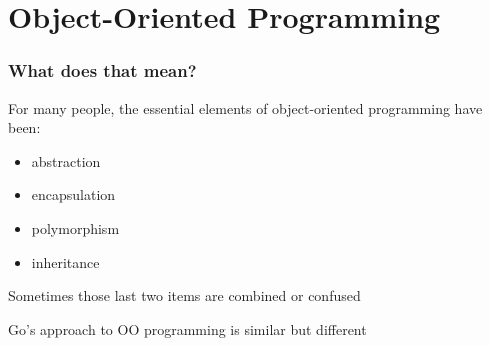 \documentclass[handout,compress,t,11pt]{beamer}
\begin{document}

%
%
%
% 
%
%
%
%
%



\section{Object-Oriented Programming}
\begin{frame}[fragile]
    \frametitle{What does that mean?}
    For many people, the essential elements of object-oriented programming
    have been:
    \begin{itemize}
        \item abstraction
        \item encapsulation
        \item polymorphism
        \item inheritance
    \end{itemize}
    \vspace{0.4\baselineskip}
    Sometimes those last two items are combined or confused \par
    \vspace{3\baselineskip}
    Go's approach to OO programming is similar but different
\end{frame}
\end{document}
